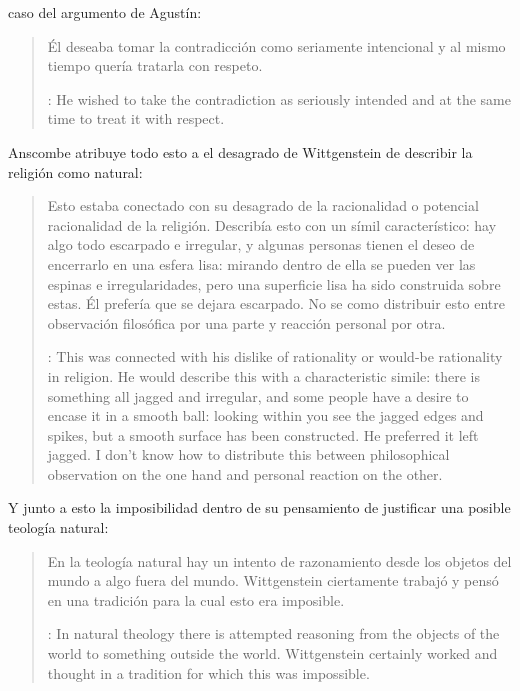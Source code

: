 caso del argumento de Agustín: \blockquote[{\cite[122]{anscombe1981parmenides:qli}}: He wished to take the contradiction as seriously intended and at the same time to treat it with respect.]{Él deseaba tomar la contradicción como seriamente intencional y al mismo tiempo quería tratarla con respeto.}

Anscombe atribuye todo esto a el desagrado de Wittgenstein de describir la religión como natural: \blockquote[{\cite[122]{anscombe1981parmenides:qli}}: This was connected with his dislike of rationality or would-be rationality in religion. He would describe this with a characteristic simile: there is something all jagged and irregular, and some people have a desire to encase it in a smooth ball: looking within you see the jagged edges and spikes, but a smooth surface has been constructed. He preferred it left jagged. I don't know how to distribute this between philosophical observation on the one hand and personal reaction on the other.]{Esto estaba conectado con su desagrado de la racionalidad o potencial racionalidad de la religión. Describía esto con un símil característico: hay algo todo escarpado e irregular, y algunas personas tienen el deseo de encerrarlo en una esfera lisa: mirando dentro de ella se pueden ver las espinas e irregularidades, pero una superficie lisa ha sido construida sobre estas. Él prefería que se dejara escarpado. No se como distribuir esto entre observación filosófica por una parte y reacción personal por otra.} Y junto a esto la imposibilidad dentro de su pensamiento de justificar una posible teología natural: \blockquote[{\cite[123]{anscombe1981parmenides:qli}}: In natural theology there is attempted reasoning from the objects of the world to something outside the world. Wittgenstein certainly worked and thought in a tradition for which this was impossible.]{En la teología natural hay un intento de razonamiento desde los objetos del mundo a algo fuera del mundo. Wittgenstein ciertamente trabajó y pensó en una tradición para la cual esto era imposible.}

